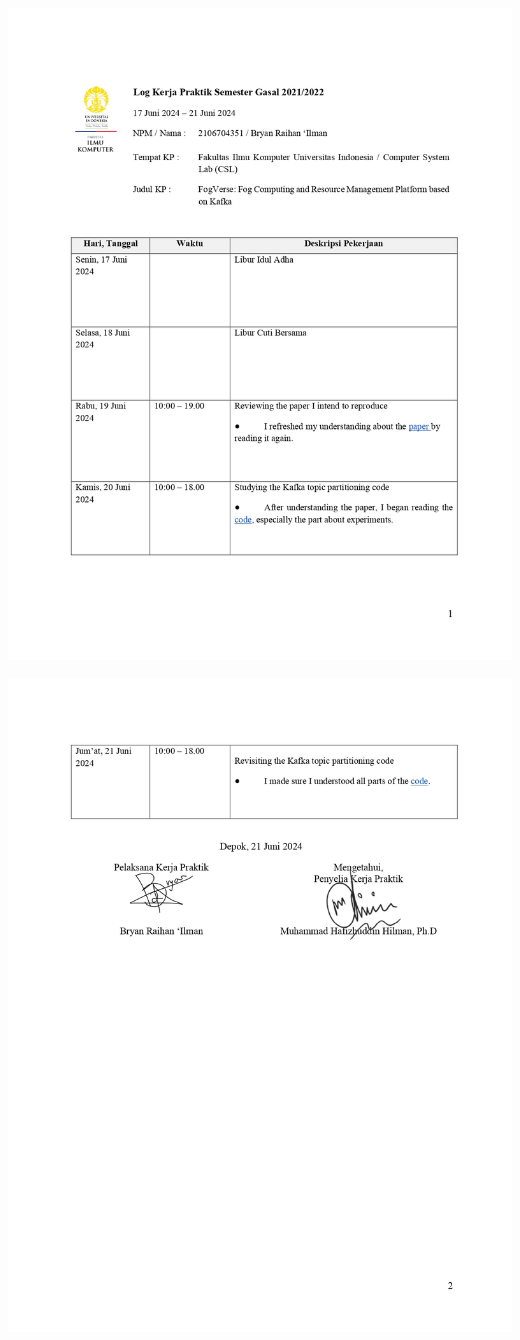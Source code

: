 \includegraphics[width=1\textwidth]{assets/pics/Log-3-CSL-Bryan Raihan Ilman-0001.jpg}

\includegraphics[width=1\textwidth]{assets/pics/Log-3-CSL-Bryan Raihan Ilman-0002.jpg}

